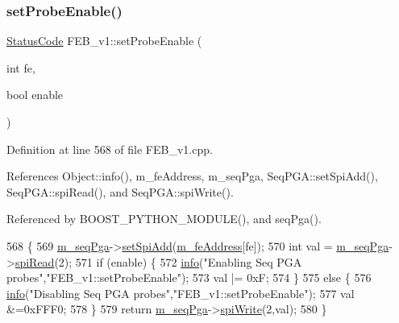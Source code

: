 \subsubsection{\texorpdfstring{set\+Probe\+Enable()}{setProbeEnable()}}
{\footnotesize\ttfamily \hyperlink{classStatusCode}{Status\+Code} F\+E\+B\+\_\+v1\+::set\+Probe\+Enable (\begin{DoxyParamCaption}\item[{int}]{fe,  }\item[{bool}]{enable }\end{DoxyParamCaption})}



Definition at line 568 of file F\+E\+B\+\_\+v1.\+cpp.



References Object\+::info(), m\+\_\+fe\+Address, m\+\_\+seq\+Pga, Seq\+P\+G\+A\+::set\+Spi\+Add(), Seq\+P\+G\+A\+::spi\+Read(), and Seq\+P\+G\+A\+::spi\+Write().



Referenced by B\+O\+O\+S\+T\+\_\+\+P\+Y\+T\+H\+O\+N\+\_\+\+M\+O\+D\+U\+L\+E(), and seq\+Pga().


\begin{DoxyCode}
568                                                      \{
569   \hyperlink{classFEB__v1_a6c7804ac86796f233a8393043adf2e77}{m\_seqPga}->\hyperlink{classSeqPGA_ac998ce3a6d9b5f2e88cc8393f8c1df53}{setSpiAdd}(\hyperlink{classFEB__v1_a4e1945c2d5b434125f375e9d0fc6d99f}{m\_feAddress}[fe]);
570   \textcolor{keywordtype}{int} val = \hyperlink{classFEB__v1_a6c7804ac86796f233a8393043adf2e77}{m\_seqPga}->\hyperlink{classSeqPGA_ab3d0e5e5d4014bc7a92588a76b8713d4}{spiRead}(2);
571   \textcolor{keywordflow}{if} (enable) \{
572     \hyperlink{classObject_a644fd329ea4cb85f54fa6846484b84a8}{info}(\textcolor{stringliteral}{"Enabling Seq PGA probes"},\textcolor{stringliteral}{"FEB\_v1::setProbeEnable"});
573     val |= 0xF;
574   \}
575   \textcolor{keywordflow}{else} \{
576     \hyperlink{classObject_a644fd329ea4cb85f54fa6846484b84a8}{info}(\textcolor{stringliteral}{"Disabling Seq PGA probes"},\textcolor{stringliteral}{"FEB\_v1::setProbeEnable"});
577     val &=0xFFF0;
578   \}
579   \textcolor{keywordflow}{return} \hyperlink{classFEB__v1_a6c7804ac86796f233a8393043adf2e77}{m\_seqPga}->\hyperlink{classSeqPGA_ad4421841ce4ce8b88ad13f63216f0743}{spiWrite}(2,val);
580 \}
\end{DoxyCode}
\mbox{\label{classFEB__v1_a244c472d16ea6778cf6ec93943a060a5}} 
